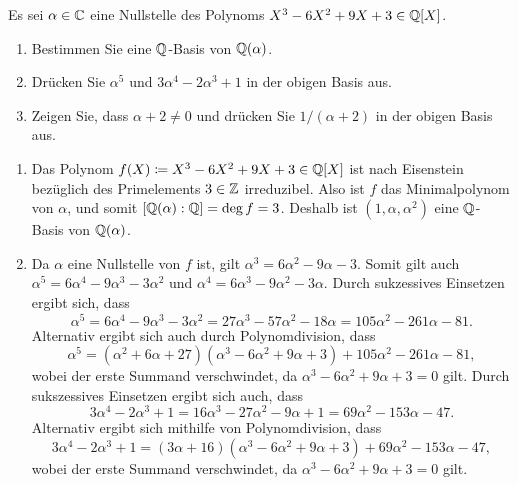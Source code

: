 \begin{question}[subtitle = Rechnen in zyklischen Erweiterungen]
  Es sei $\alpha \in \mathbb{C}$ eine Nullstelle des Polynoms $X^3 - 6 X^2 + 9 X + 3 \in \mathbb{Q}[X]$.
  \begin{enumerate}
    \item
      Bestimmen Sie eine $\mathbb{Q}$-Basis von $\mathbb{Q}(\alpha)$.
    \item
      Drücken Sie $\alpha^5$ und $3 \alpha^4 - 2 \alpha^3 + 1$ in der obigen Basis aus.
    \item
      Zeigen Sie, dass $\alpha + 2 \neq 0$ und drücken Sie $1/(\alpha + 2)$ in der obigen Basis aus.
  \end{enumerate}
\end{question}


\begin{solution}
  \begin{enumerate}
    \item
      Das Polynom $f(X) \coloneqq X^3 - 6 X^2 + 9 X + 3 \in \mathbb{Q}[X]$ ist nach Eisenstein bezüglich des Primelements $3 \in \mathbb{Z}$ irreduzibel.
      Also ist $f$ das Minimalpolynom von $\alpha$, und somit $[\mathbb{Q}(\alpha) : \mathbb{Q}] = \deg f = 3$.
      Deshalb ist $(1, \alpha, \alpha^2)$ eine $\mathbb{Q}$-Basis von $\mathbb{Q}(\alpha)$.
    
    \item
      Da $\alpha$ eine Nullstelle von $f$ ist, gilt $\alpha^3 = 6 \alpha^2 - 9 \alpha - 3$.
      Somit gilt auch $\alpha^5 = 6 \alpha^4 - 9 \alpha^3 - 3 \alpha^2$ und $\alpha^4 = 6 \alpha^3 - 9 \alpha^2 - 3 \alpha$.
      Durch sukzessives Einsetzen ergibt sich, dass
      \[
          \alpha^5
        = 6 \alpha^4 - 9 \alpha^3 - 3 \alpha^2
        = 27 \alpha^3 - 57 \alpha^2 - 18 \alpha
        = 105 \alpha^2 - 261 \alpha - 81.
      \]
      Alternativ ergibt sich auch durch Polynomdivision, dass
      \[
          \alpha^5
        = (\alpha^2 + 6 \alpha + 27)(\alpha^3 - 6 \alpha^2 + 9 \alpha + 3) + 105 \alpha^2 - 261 \alpha - 81,
      \]
      wobei der erste Summand verschwindet, da $\alpha^3 - 6 \alpha^2 + 9 \alpha + 3 = 0$ gilt.
      Durch sukszessives Einsetzen ergibt sich auch, dass
      \[
          3 \alpha^4 - 2 \alpha^3 + 1
        = 16 \alpha^3 - 27 \alpha^2 - 9 \alpha + 1
        = 69 \alpha^2 - 153 \alpha - 47.
      \]
      Alternativ ergibt sich mithilfe von Polynomdivision, dass
      \[
          3 \alpha^4 - 2 \alpha^3 + 1
        = (3 \alpha + 16)(\alpha^3 - 6 \alpha^2 + 9 \alpha + 3) + 69 \alpha^2 - 153 \alpha - 47,
      \]
      wobei der erste Summand verschwindet, da $\alpha^3 - 6 \alpha^2 + 9 \alpha + 3 = 0$ gilt.
    

\end{enumerate}
\end{solution}
